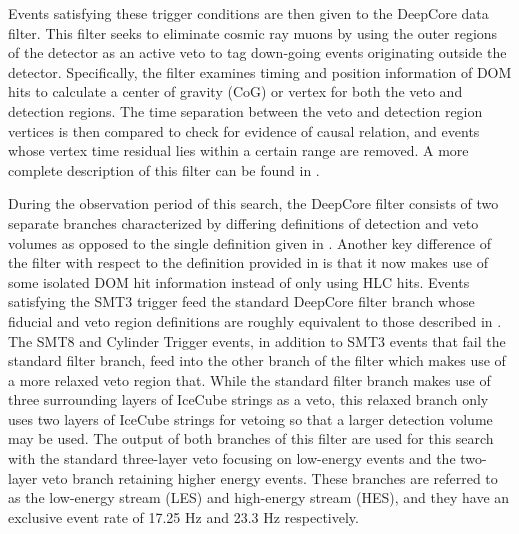 \documentclass[manuscript]{aastex}
\begin{document}
Events satisfying these trigger conditions are then given to the DeepCore data filter. This filter seeks to eliminate cosmic ray muons by using the outer regions of the detector as an active veto to tag down-going events originating outside the detector. Specifically, the filter examines timing and position information of DOM hits to calculate a center of gravity (CoG) or vertex for both the veto and detection regions. The time separation between the veto and detection region vertices is then compared to check for evidence of causal relation, and events whose vertex time residual lies within a certain range are removed. A more complete description of this filter can be found in \cite{2012APh....35..615A}.

During the observation period of this search, the DeepCore filter consists of two separate branches characterized by differing definitions of detection and veto volumes as opposed to the single definition given in \cite{2012APh....35..615A}. Another key difference of the filter with respect to the definition provided in \cite{2012APh....35..615A} is that it now makes use of some isolated DOM hit information instead of only using HLC hits. Events satisfying the SMT3 trigger feed the standard DeepCore filter branch whose fiducial and veto region definitions are roughly equivalent to those described in \cite{2012APh....35..615A}. The SMT8 and Cylinder Trigger events, in addition to SMT3 events that fail the standard filter branch, feed into the other branch of the filter which makes use of a more relaxed veto region that. While the standard filter branch makes use of three surrounding layers of IceCube strings as a veto, this relaxed branch only uses two layers of IceCube strings for vetoing so that a larger detection volume may be used. The output of both branches of this filter are used for this search with the standard three-layer veto focusing on low-energy events and the two-layer veto branch retaining higher energy events. These branches are referred to as the low-energy stream (LES) and high-energy stream (HES), and they have an exclusive event rate of 17.25 Hz and 23.3 Hz respectively.
\end{document}
